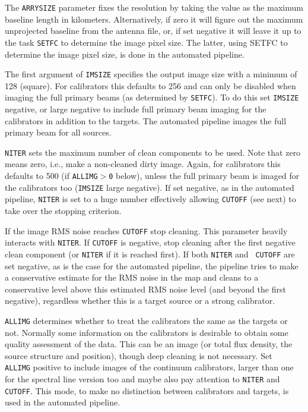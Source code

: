 The {\tt ARRYSIZE} parameter fixes the resolution by taking the value
as the maximum baseline length in kilometers. Alternatively, if zero
it will figure out the maximum unprojected baseline from the antenna
file, or, if set negative it will leave it up to the task {\tt SETFC}
to determine the image pixel size. The latter, using SETFC to
determine the image pixel size, is done in the automated
pipeline.

The first argument of {\tt IMSIZE} specifies the output image size
with a minimum of 128 (square). For calibrators this defaults to 256
and can only be disabled when imaging the full primary beams (as
determined by {\tt SETFC}). To do this set {\tt IMSIZE} negative, or
large negative to include full primary beam imaging for the
calibrators in addition to the targets. The automated pipeline images
the full primary beam for all sources.

{\tt NITER} sets the maximum number of clean components to be
used. Note that zero means zero, i.e., make a non-cleaned dirty
image. Again, for calibrators this defaults to 500 (if {\tt ALLIMG$>$0}
below), unless the full primary beam is imaged for the calibrators too
({\tt IMSIZE} large negative). If set negative, as in the automated
pipeline, {\tt NITER} is set to a huge number effectively allowing
{\tt CUTOFF} (see next) to take over the stopping criterion.

If the image RMS noise reaches {\tt CUTOFF} stop cleaning. This
parameter heavily interacts with {\tt NITER}. If {\tt CUTOFF} is
negative, stop cleaning after the first negative clean component (or
{\tt NITER} if it is reached first). If both {\tt NITER} and {\tt
CUTOFF} are set negative, as is the case for the automated pipeline,
the pipeline tries to make a conservative estimate for the RMS noise
in the map and cleans to a conservative level above this estimated RMS
noise level (and beyond the first negative), regardless whether this is a target source or a strong
calibrator.

{\tt ALLIMG} determines whether to treat the calibrators the same as
the targets or not. Normally some information on the calibrators is
desirable to obtain some quality assessment of the data. This can be
an image (or total flux density, the source structure and position),
though deep cleaning is not necessary. Set {\tt
ALLIMG} positive to include images of the continuum calibrators, larger
than one for the spectral line version too and maybe also pay
attention to {\tt NITER} and {\tt CUTOFF}. This mode, to make no
distinction between calibrators and targets, is used in the
automated pipeline.

